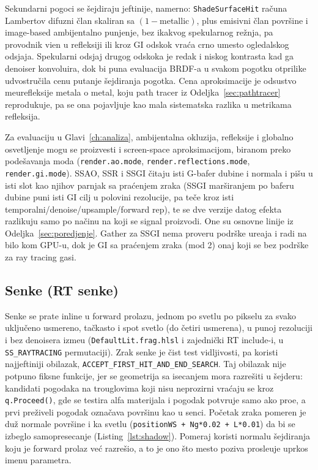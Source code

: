 Sekundarni pogoci se \v{s}ejdiraju jeftinije, namerno: \texttt{ShadeSurfaceHit} ra\v{c}una Lambertov difuzni \v{c}lan skaliran sa $(1 - \text{metallic})$, plus emisivni \v{c}lan povr\v{s}ine i image-based ambijentalno punjenje, bez ikakvog spekularnog re\v{z}nja, pa provodnik vi\dj{}en u refleksiji ili kroz GI odskok vra\'ca crno umesto ogledalskog odsjaja. Spekularni odsjaj drugog odskoka je redak i niskog kontrasta kad ga denoiser konvoluira, dok bi puna evaluacija BRDF-a u svakom pogotku otprilike udvostru\v{c}ila cenu putanje \v{s}ejdiranja pogotka. Cena aproksimacije je odsustvo me\dj{}urefleksije metala o metal, koju path tracer iz Odeljka~\ref{sec:pathtracer} reprodukuje, pa se ona pojavljuje kao mala sistematska razlika u metrikama refleksija.

Za evaluaciju u Glavi~\ref{ch:analiza}, ambijentalna okluzija, refleksije i globalno osvetljenje mogu se proizvesti i screen-space aproksimacijom, biranom preko pode\v{s}avanja moda (\texttt{render.ao.mode}, \texttt{render.reflections.mode}, \texttt{render.gi.mode}). SSAO, SSR i SSGI \v{c}itaju isti G-bafer dubine i normala i pi\v{s}u u isti slot kao njihov parnjak sa pra\'cenjem zraka (SSGI mar\v{s}iranjem po baferu dubine puni isti GI cilj u polovini rezolucije, pa te\v{c}e kroz isti temporalni/denoise/upsample/forward rep), te se dve verzije datog efekta razlikuju samo po na\v{c}inu na koji se signal proizvodi. One su osnovne linije iz Odeljka~\ref{sec:poredjenje}. Gather za SSGI nema proveru podr\v{s}ke ure\dj{}aja i radi na bilo kom GPU-u, dok je GI sa pra\'cenjem zraka (mod 2) onaj koji se bez podr\v{s}ke za ray tracing gasi.

\subsection{Senke (RT senke)}
\label{sec:senke}

Senke se prate inline u forward prolazu, jednom po svetlu po pikselu za svako uklju\v{c}eno usmereno, ta\v{c}kasto i spot svetlo (do \v{c}etiri usmerena), u punoj rezoluciji i bez denoisera izme\dj{}u (\texttt{DefaultLit.frag.hlsl} i zajedni\v{c}ki RT include-i, u \texttt{SS_RAYTRACING} permutaciji). Zrak senke je \v{c}ist test vidljivosti, pa koristi najjeftiniji obilazak, \texttt{ACCEPT_FIRST_HIT_AND_END_SEARCH}. Taj obilazak nije potpuno fiksne funkcije, jer se geometrija sa isecanjem mora razre\v{s}iti u \v{s}ejderu: kandidati pogodaka na trouglovima koji nisu neprozirni vra\'caju se kroz \texttt{q.Proceed()}, gde se testira alfa materijala i pogodak potvr\dj{}uje samo ako pro\dj{}e, a prvi pre\v{z}iveli pogodak ozna\v{c}ava povr\v{s}inu kao u senci. Po\v{c}etak zraka pomeren je du\v{z} normale povr\v{s}ine i ka svetlu (\texttt{positionWS + Ng*0.02 + L*0.01}) da bi se izbeglo samopresecanje (Listing~\ref{lst:shadow}). Pomeraj koristi normalu \v{s}ejdiranja koju je forward prolaz ve\'c razre\v{s}io, a to je ono \v{s}to mesto poziva prosle\dj{}uje uprkos imenu parametra.

